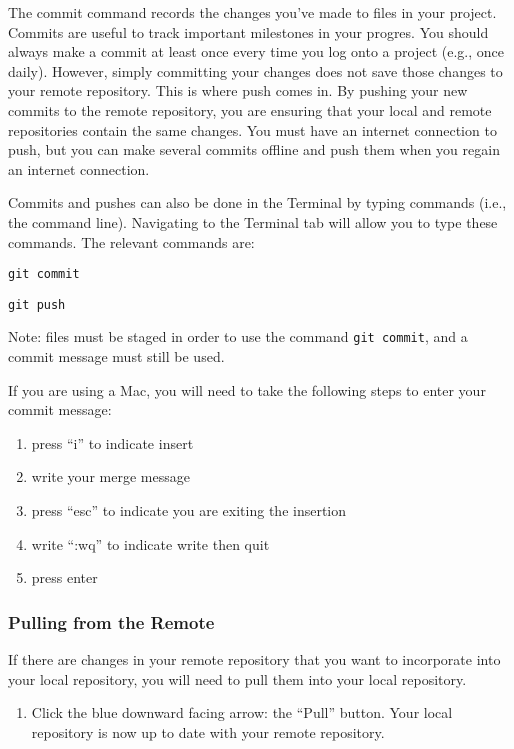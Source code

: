 \documentclass[]{article}
\providecommand{\tightlist}{%
  \setlength{\itemsep}{0pt}\setlength{\parskip}{0pt}}
\begin{document}
The commit command records the changes you've made to files in your
project. Commits are useful to track important milestones in your
progres. You should always make a commit at least once every time you
log onto a project (e.g., once daily). However, simply committing your
changes does not save those changes to your remote repository. This is
where push comes in. By pushing your new commits to the remote
repository, you are ensuring that your local and remote repositories
contain the same changes. You must have an internet connection to push,
but you can make several commits offline and push them when you regain
an internet connection.

Commits and pushes can also be done in the Terminal by typing commands
(i.e., the command line). Navigating to the Terminal tab will allow you
to type these commands. The relevant commands are:

\texttt{git\ commit}

\texttt{git\ push}

Note: files must be staged in order to use the command
\texttt{git\ commit}, and a commit message must still be used.

If you are using a Mac, you will need to take the following steps to
enter your commit message:

\begin{enumerate}
\def\labelenumi{\arabic{enumi}.}
\item
  press ``i'' to indicate insert
\item
  write your merge message
\item
  press ``esc'' to indicate you are exiting the insertion
\item
  write ``:wq'' to indicate write then quit
\item
  press enter
\end{enumerate}

\subsubsection{Pulling from the Remote}\label{pulling-from-the-remote}

If there are changes in your remote repository that you want to
incorporate into your local repository, you will need to pull them into
your local repository.

\begin{enumerate}
\def\labelenumi{\arabic{enumi}.}
\tightlist
\item
  Click the blue downward facing arrow: the ``Pull'' button. Your local
  repository is now up to date with your remote repository.
\end{enumerate}
\end{document}
